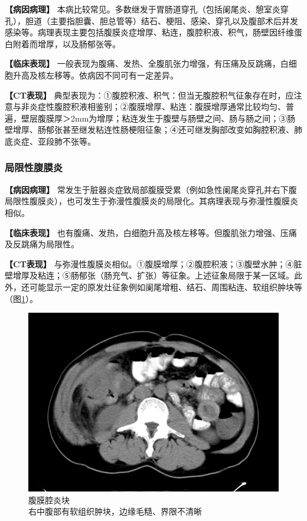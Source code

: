 \textbf{【病因病理】}
本病比较常见。多数继发于胃肠道穿孔（包括阑尾炎、憩室炎穿孔），胆道（主要指胆囊、胆总管等）结石、梗阻、感染、穿孔以及腹部术后并发感染等。病理表现主要包括腹膜炎症增厚、粘连，腹腔积液、积气，肠壁因纤维蛋白附着而增厚，以及肠郁张等。

\textbf{【临床表现】}
一般表现为腹痛、发热、全腹肌张力增强，有压痛及反跳痛，白细胞升高及核左移等。依病因不同可有一定差异。

\textbf{【CT表现】}
典型表现为：①腹腔积液、积气：但当无腹腔积气征象存在时，应注意与非炎症性腹腔积液相鉴别；②腹膜增厚、粘连：腹膜增厚通常比较均匀、普遍，壁层腹膜厚＞2mm为增厚；粘连发生于腹壁与肠壁之间、肠与肠之间；③肠壁增厚、肠郁张甚至继发粘连性肠梗阻征象；④还可继发胸部改变如胸腔积液、肺底炎症、亚段肺不张等。

\subsubsection{局限性腹膜炎}

\textbf{【病因病理】}
常发生于脏器炎症致局部腹膜受累（例如急性阑尾炎穿孔并右下腹局限性腹膜炎），也可发生于弥漫性腹膜炎的局限化。其病理表现与弥漫性腹膜炎相似。

\textbf{【临床表现】}
也有腹痛、发热，白细胞升高及核左移等。但腹肌张力增强、压痛及反跳痛为局限性。

\textbf{【CT表现】}
与弥漫性腹膜炎相似。①腹膜增厚；②腹腔积液；③腹壁水肿；④脏壁增厚及粘连；⑤肠郁张（肠充气、扩张）等征象。上述征象局限于某一区域。此外，还可能显示一定的原发灶征象例如阑尾增粗、结石、周围粘连、软组织肿块等（图\ref{fig18-5}）。

\begin{figure}[!htbp]
 \centering
 \includegraphics[width=.7\textwidth,height=\textheight,keepaspectratio]{./images/Image00374.jpg}
 \captionsetup{justification=centering}
 \caption{腹膜腔炎块\\{\small 右中腹部有软组织肿块，边缘毛糙、界限不清晰}}
 \label{fig18-5}
  \end{figure} 

